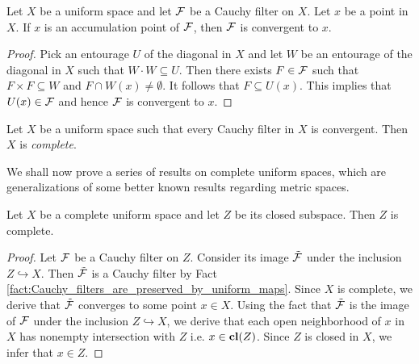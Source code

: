 \begin{fact}\label{fact:Cauchy_filter_with_accumultation_point_is_convergent}
	Let $X$ be a uniform space and let ${\mathcal F}$ be a Cauchy filter on $X$. Let $x$ be a point in $X$. If $x$ is an accumulation point of ${\mathcal F}$, then ${\mathcal F}$ is convergent to $x$.
\end{fact}
\begin{proof}
	Pick an entourage $U$ of the diagonal in $X$ and let $W$ be an entourage of the diagonal in $X$ such that $W\cdot W \subseteq U$. Then there exists $F \in {\mathcal F}$ such that $F\times F \subseteq W$ and $F\cap W(x)\neq \emptyset$. It follows that $F\subseteq U(x)$. This implies that $U(x) \in {\mathcal F}$ and hence ${\mathcal F}$ is convergent to $x$.
\end{proof}

\begin{definition}
	Let $X$ be a uniform space such that every Cauchy filter in $X$ is convergent. Then $X$ is \textit{complete}.
\end{definition}
\noindent
We shall now prove a series of results on complete uniform spaces, which are generalizations of some better known results regarding metric spaces.

\begin{theorem}\label{theorem:completeness_is_inheritied_by_closed_subspaces}
	Let $X$ be a complete uniform space and let $Z$ be its closed subspace. Then $Z$ is complete.
\end{theorem}
\begin{proof}
	Let ${\mathcal F}$ be a Cauchy filter on $Z$. Consider its image $\tilde{{\mathcal F}}$ under the inclusion $Z\hookrightarrow X$. Then $\tilde{{\mathcal F}}$ is a Cauchy filter by Fact \ref{fact:Cauchy_filters_are_preserved_by_uniform_maps}. Since $X$ is complete, we derive that $\tilde{{\mathcal F}}$ converges to some point $x \in X$. Using the fact that $\tilde{{\mathcal F}}$ is the image of ${\mathcal F}$ under the inclusion $Z\hookrightarrow X$, we derive that each open neighborhood of $x$ in $X$ has nonempty intersection with $Z$ i.e. $x\in \mathbf{cl}(Z)$. Since $Z$ is closed in $X$, we infer that $x \in Z$.
\end{proof}

